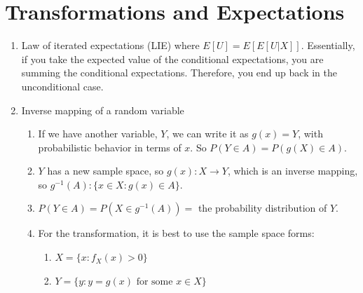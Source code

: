 \documentclass{article}
\begin{document}
\section{Transformations and Expectations}

\begin{enumerate}
    \item Law of iterated expectations (LIE) where \( E[U] = E[E[U|X]] \). Essentially, if you take the expected value of the conditional expectations, you are summing the conditional expectations. Therefore, you end up back in the unconditional case. 
    \item Inverse mapping of a random variable
    \begin{enumerate}
        \item If we have another variable, \( Y \), we can write it as \( g(x) = Y \), with probabilistic behavior in terms of \( x \). So \( P(Y \in A) = P(g(X) \in A) \).
        \item \( Y \) has a new sample space, so \( g(x): X \to Y \), which is an inverse mapping, so \( g^{-1}(A): \{ x \in X: g(x) \in A \} \).
        \item \( P(Y \in A) = P(X \in g^{-1}(A)) = \) the probability distribution of \( Y \).
        \item For the transformation, it is best to use the sample space forms:
        \begin{enumerate}
            \item \( X = \{ x: f_X(x) > 0 \} \)
            \item \( Y = \{ y: y = g(x) \text{ for some } x \in X \} \)
        \end{enumerate}
    \end{enumerate}
    

\end{enumerate}
\end{document}
